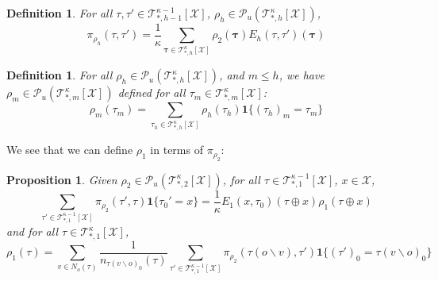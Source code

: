 \documentclass[12pt]{article}
\newtheorem{proposition}[theorem]{Proposition}
\newtheorem{definition}[theorem]{Definition}
\newcommand{\one}[1]{\mathbf{1}\{#1\}}
\newcommand{\tree}[2]{\mathcal{T}_{*, #1}^{#2}[\mathcal{X}]}
\newcommand{\TB}{{ \boldsymbol\tau}}
\numberwithin{equation}{section}
\begin{document}
\begin{definition}
    For all $\tau, \tau'\in \mathcal{T}_{*, h-1}^{\kappa-1}[\mathcal{X}]$, $\rho_h\in \mathcal{P}_u(\mathcal{T}_{*, h}^\kappa[\mathcal{X}])$,
    \begin{equation*}
        \pi_{\rho_h}(\tau, \tau') = \frac1\kappa \sum_{\TB\in \mathcal{T}_{*, h}^\kappa[\mathcal{X}]} \rho_2(\TB) E_h(\tau, \tau')(\TB)
    \end{equation*}
\end{definition}


\begin{definition}
    For all $\rho_h\in \mathcal{P}_u(\mathcal{T}_{*, h}^\kappa[\mathcal{X}])$, and $m\leq h$, we have
    $\rho_m\in \mathcal{P}_u(\mathcal{T}_{*, m}^\kappa[\mathcal{X}])$ defined for all $\tau_m \in \mathcal{T}_{*, m}^\kappa[\mathcal{X}]$:
    \begin{equation*}
        \rho_m(\tau_m) = \sum_{\tau_h\in \mathcal{T}_{*, h}^\kappa[\mathcal{X}]} \rho_h(\tau_h)\mathbf{1}\{(\tau_h)_m = \tau_m\}
    \end{equation*}
\end{definition}

We see that we can define $\rho_1$ in terms of $\pi_{\rho_2}$:
\begin{proposition}
    Given $\rho_2\in \mathcal{P}_u(\mathcal{T}_{*, 2}^\kappa[\mathcal{X}])$, for all $\tau\in \mathcal{T}_{*, 1}^{\kappa-1}[\mathcal{X}]$, $x\in \mathcal{X}$,
    \begin{equation}\label{Eq.NNNI-rho1-in-pi-rho2}
        \sum_{\tau'\in\tree{1}{\kappa-1}}\pi_{\rho_2}(\tau',\tau)\one{\tau_0'=x} = \frac1\kappa E_1(x, \tau_0)(\tau\oplus x) \rho_1(\tau\oplus x)
    \end{equation}
    and for all $\tau\in \mathcal{T}_{*, 1}^{\kappa}[\mathcal{X}]$,
    \begin{equation}\label{Eq.NNNI-rho1-in-pi-rho2-2}
        \rho_1(\tau) = \sum_{v\in N_o(\tau)}\frac1{n_{\tau(v\backslash o)_0}(\tau)}\sum_{\tau'\in\tree{1}{\kappa-1}}\pi_{\rho_2}(\tau(o\backslash v), \tau')\one{(\tau')_0=\tau(v\backslash o)_0}
    \end{equation}
\end{proposition}
\end{document}
